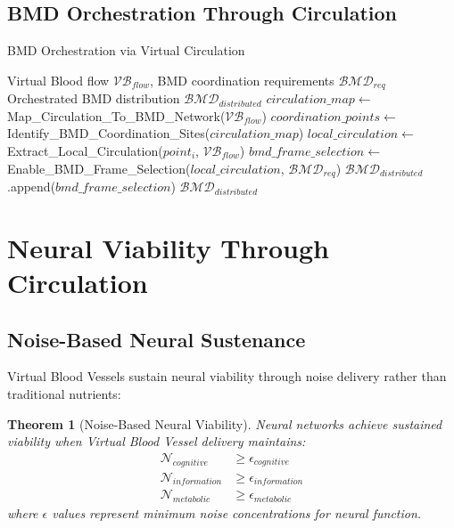 \documentclass[12pt,a4paper]{article}
\newtheorem{theorem}{Theorem}
\begin{document}
\subsection{BMD Orchestration Through Circulation}

\begin{algorithm}
\caption{BMD Orchestration via Virtual Circulation}
\begin{algorithmic}[1]
\REQUIRE Virtual Blood flow $\mathcal{VB}_{flow}$, BMD coordination requirements $\mathcal{BMD}_{req}$
\ENSURE Orchestrated BMD distribution $\mathcal{BMD}_{distributed}$
\STATE $circulation\_map \leftarrow$ Map\_Circulation\_To\_BMD\_Network($\mathcal{VB}_{flow}$)
\STATE $coordination\_points \leftarrow$ Identify\_BMD\_Coordination\_Sites($circulation\_map$)
    \STATE $local\_circulation \leftarrow$ Extract\_Local\_Circulation($point_i$, $\mathcal{VB}_{flow}$)
    \STATE $bmd\_frame\_selection \leftarrow$ Enable\_BMD\_Frame\_Selection($local\_circulation$, $\mathcal{BMD}_{req}$)
    \STATE $\mathcal{BMD}_{distributed}$.append($bmd\_frame\_selection$)
\ENDFOR
\RETURN $\mathcal{BMD}_{distributed}$
\end{algorithmic}
\end{algorithm}

\section{Neural Viability Through Circulation}

\subsection{Noise-Based Neural Sustenance}

Virtual Blood Vessels sustain neural viability through noise delivery rather than traditional nutrients:

\begin{theorem}[Noise-Based Neural Viability]
Neural networks achieve sustained viability when Virtual Blood Vessel delivery maintains:
\begin{align}
\mathcal{N}_{cognitive} &\geq \epsilon_{cognitive} \\
\mathcal{N}_{information} &\geq \epsilon_{information} \\
\mathcal{N}_{metabolic} &\geq \epsilon_{metabolic}
\end{align}
where $\epsilon$ values represent minimum noise concentrations for neural function.
\end{theorem}
\end{document}
